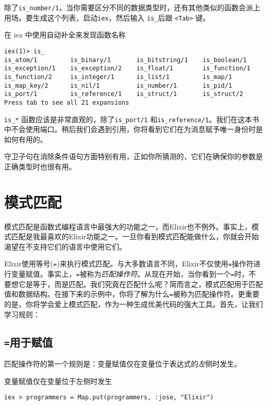 除了\texttt{is\_number/1}，当你需要区分不同的数据类型时，还有其他类似的函数会派上用场。要生成这个列表，启动\texttt{iex}，然后输入 \texttt{is\_}后跟 \texttt{<Tab>} 键。

\begin{code}{在 iex 中使用自动补全来发现函数名称}
\begin{verbatim}
iex(1)> is_
is_atom/1         is_binary/1       is_bitstring/1    is_boolean/1
is_exception/1    is_exception/2    is_float/1        is_function/1
is_function/2     is_integer/1      is_list/1         is_map/1
is_map_key/2      is_nil/1          is_number/1       is_pid/1
is_port/1         is_reference/1    is_struct/1       is_struct/2
Press tab to see all 21 expansions
\end{verbatim}
\label{lst:using_autocompletion_in_iex_to_discover_function_names}
\end{code}

\texttt{is\_*} 函数应该是非常直观的，除了\texttt{is\_port/1} 和\texttt{is\_reference/1}。我们在这本书中不会使用端口。稍后我们会遇到引用，你将看到它们在为消息赋予唯一身份时是如何有用的。

守卫子句在消除条件语句方面特别有用，正如你所猜测的，它们在确保你的参数是正确类型时也很有用。

\section{模式匹配}

模式匹配是函数式编程语言中最强大的功能之一，而Elixir也不例外。事实上，模式匹配是我最喜欢的Elixir功能之一。一旦你看到模式匹配能做什么，你就会开始渴望在不支持它们的语言中使用它们。

Elixir使用等号(\texttt{=})来执行模式匹配。与大多数语言不同，Elixir不仅使用\texttt{=}操作符进行变量赋值。事实上，\texttt{=}被称为\emph{匹配操作符}。从现在开始，当你看到一个\texttt{=}时，不要想它是等于，而是匹配。我们究竟在匹配什么呢？简而言之，模式匹配用于匹配值和数据结构。在接下来的示例中，你将了解为什么\texttt{=}被称为匹配操作符。更重要的是，你将学会爱上模式匹配，作为一种生成优美代码的强大工具。首先，让我们学习规则：


\subsection{\texttt{=}用于赋值}

匹配操作符的第一个规则是：变量赋值仅在变量位于表达式的\emph{左}侧时发生。

\begin{code}{变量赋值仅在变量位于左侧时发生}
\begin{verbatim}
iex > programmers = Map.put(programmers, :jose, "Elixir")
\end{verbatim}
\label{lst:variable_assignment_only_happens_when_the_variable_is_on_the_left}
\end{code}

